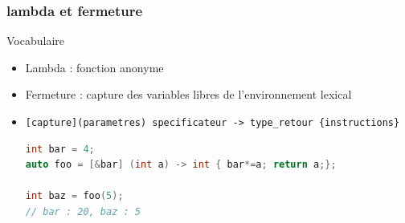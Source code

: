 \documentclass[C++.tex]{subfiles}
\begin{document}
\begin{frame}[fragile]
	\frametitle{lambda et fermeture}
	\begin{block}{Vocabulaire}
		\begin{itemize}
			\item Lambda : fonction anonyme
			\item Fermeture : capture des variables libres de l'environnement lexical
		\end{itemize}
	\end{block}

	\pause

	\begin{itemize}
		\item \lstinline|[capture](parametres) specificateur -> type_retour {instructions}|

		\begin{lstlisting}[language=C++]
int bar = 4;
auto foo = [&bar] (int a) -> int { bar*=a; return a;};

int baz = foo(5);
// bar : 20, baz : 5\end{lstlisting}
	\end{itemize}
\end{frame}
\end{document}
